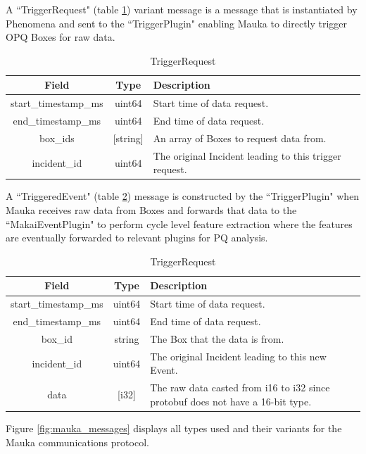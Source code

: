 A ``TriggerRequest" (table \ref{table:TriggerRequest}) variant message is a message that is instantiated by Phenomena and sent to the ``TriggerPlugin" enabling Mauka to directly trigger OPQ Boxes for raw data. 

\begin{table}[H]
	\centering
	\caption{TriggerRequest}
	\begin{tabular}{|c|c|p{8cm}|}
		\hline 
		Field & Type & Description  \\ 
		\hline
		start\_timestamp\_ms & uint64 & Start time of data request. \\
		\hline
		end\_timestamp\_ms & uint64 & End time of data request. \\
		\hline
		box\_ids & [string] & An array of Boxes to request data from. \\
		\hline
		incident\_id & uint64 & The original Incident leading to this trigger request. \\
		\hline
	\end{tabular} 
	\label{table:TriggerRequest}
\end{table}

A ``TriggeredEvent" (table \ref{table:TriggeredEvent}) message is constructed by the ``TriggerPlugin" when Mauka receives raw data from Boxes and forwards that data to the  ``MakaiEventPlugin" to perform cycle level feature extraction where the features are eventually forwarded  to relevant plugins for PQ analysis.

\begin{table}[H]
	\centering
	\caption{TriggerRequest}
	\begin{tabular}{|c|c|p{8cm}|}
		\hline 
		Field & Type & Description  \\ 
		\hline
		start\_timestamp\_ms & uint64 & Start time of data request. \\
		\hline
		end\_timestamp\_ms & uint64 & End time of data request. \\
		\hline
		box\_id & string & The Box that the data is from. \\
		\hline
		incident\_id & uint64 & The original Incident leading to this new Event. \\
		\hline
		data & [i32] & The raw data casted from i16 to i32 since protobuf does not have a 16-bit type. \\
		\hline
	\end{tabular} 
	\label{table:TriggeredEvent}
\end{table}

Figure \ref{fig:mauka_messages} displays all types used and their variants for the Mauka communications protocol. 

